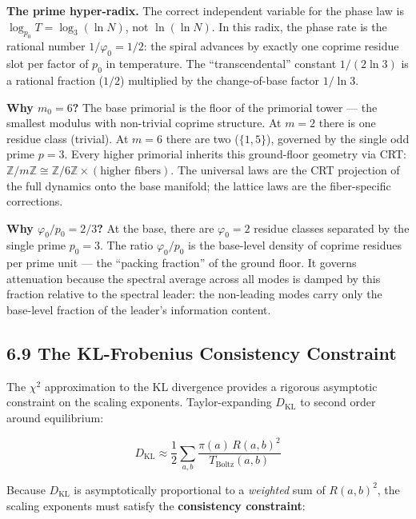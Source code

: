 \documentclass[
  11pt,
]{article}
\numberwithin{equation}{section}
\begin{document}
\textbf{The prime hyper-radix.} The correct independent variable for the
phase law is \(\log_{p_0} T = \log_3(\ln N)\), not \(\ln(\ln N)\). In
this radix, the phase rate is the rational number \(1/\varphi_0 = 1/2\):
the spiral advances by exactly one coprime residue slot per factor of
\(p_0\) in temperature. The ``transcendental'' constant \(1/(2\ln 3)\)
is a rational fraction (\(1/2\)) multiplied by the change-of-base factor
\(1/\ln 3\).

\textbf{Why \(m_0 = 6\)?} The base primorial is the floor of the
primorial tower --- the smallest modulus with non-trivial coprime
structure. At \(m = 2\) there is one residue class (trivial). At
\(m = 6\) there are two (\(\{1, 5\}\)), governed by the single odd prime
\(p = 3\). Every higher primorial inherits this ground-floor geometry
via CRT:
\(\mathbb{Z}/m\mathbb{Z} \cong \mathbb{Z}/6\mathbb{Z} \times (\text{higher fibers})\).
The universal laws are the CRT projection of the full dynamics onto the
base manifold; the lattice laws are the fiber-specific corrections.

\textbf{Why \(\varphi_0/p_0 = 2/3\)?} At the base, there are
\(\varphi_0 = 2\) residue classes separated by the single prime
\(p_0 = 3\). The ratio \(\varphi_0/p_0\) is the base-level density of
coprime residues per prime unit --- the ``packing fraction'' of the
ground floor. It governs attenuation because the spectral average across
all modes is damped by this fraction relative to the spectral leader:
the non-leading modes carry only the base-level fraction of the leader's
information content.

\subsection{6.9 The KL-Frobenius Consistency
Constraint}\label{the-kl-frobenius-consistency-constraint}

The \(\chi^2\) approximation to the KL divergence provides a rigorous
asymptotic constraint on the scaling exponents. Taylor-expanding
\(D_{\text{KL}}\) to second order around equilibrium:

\begin{equation}D_{\text{KL}} \approx \frac{1}{2} \sum_{a,b} \frac{\pi(a) \, R(a,b)^2}{T_{\text{Boltz}}(a,b)}\end{equation}

Because \(D_{\text{KL}}\) is asymptotically proportional to a
\emph{weighted} sum of \(R(a,b)^2\), the scaling exponents must satisfy
the \textbf{consistency constraint}:
\end{document}
